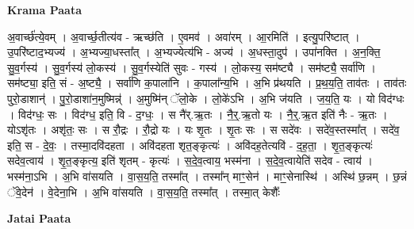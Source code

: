 \documentclass[17pt]{extarticle}
\begin{document}
\textbf{Krama Paata} \newline

अ॒वार्च्छ॑त्ये॒वम् । अ॒वार्च्छ॒तीत्य॑व - ऋच्छ॑ति । ए॒वमव॑ । अवा॑रम् । आ॒रमिति॑ । इत्यु॒परि॑ष्टात् । उ॒परि॑ष्टाद॒भ्यज्य॑ । अ॒भ्यज्या॒धस्ता᳚त् । अ॒भ्यज्येत्य॑भि - अज्य॑ । अ॒धस्ता॒दुप॑ । उपा॑नक्ति । अ॒न॒क्ति॒ सु॒व॒र्गस्य॑ । सु॒व॒र्गस्य॑ लो॒कस्य॑ । सु॒व॒र्गस्येति॑ सुवः - गस्य॑ । लो॒कस्य॒ सम॑ष्ट्यै । सम॑ष्ट्यै॒ सर्वा॑णि । सम॑ष्ट्या॒ इति॒ सं - अ॒ष्ट्यै॒ । सर्वा॑णि क॒पाला॑नि । क॒पाला᳚न्य॒भि । अ॒भि प्र॑थयति । प्र॒थ॒य॒ति॒ ताव॑तः । ताव॑तः पुरो॒डाशान्॑ । पु॒रो॒डाशा॑न॒मुष्मिन्न्॑ । अ॒मुष्मि॑न् ॅलो॒के । लो॒के॑ऽभि । अ॒भि ज॑यति । ज॒य॒ति॒ यः । यो विद॑ग्धः । विद॑ग्धः॒ सः । विद॑ग्ध॒ इति॒ वि - द॒ग्धः॒ । स नै॑र्.ऋ॒तः । नै॒र्॒.ऋ॒तो यः । नै॒र्॒.ऋ॒त इति॑ नैः - ऋ॒तः । योऽशृ॑तः । अशृ॑तः॒ सः । स रौ॒द्रः । रौ॒द्रो यः । यः शृ॒तः । शृ॒तः सः । स सदे॑वः । सदे॑व॒स्तस्मा᳚त् । सदे॑व॒ इति॒ स - दे॒वः॒ । तस्मा॒दवि॑दहता । अवि॑दहता शृत॒ङ्कृत्यः॑ । अवि॑दह॒तेत्यवि॑ - द॒ह॒ता॒ । शृ॒त॒ङ्कृत्यः॑ सदेव॒त्वाय॑ । शृ॒त॒ङ्कृत्य॒ इति॑ शृतम् - कृत्यः॑ । स॒दे॒व॒त्वाय॒ भस्म॑ना । स॒दे॒व॒त्वायेति॑ सदेव - त्वाय॑ । भस्म॑ना॒ऽभि । अ॒भि वा॑सयति । वा॒स॒य॒ति॒ तस्मा᳚त् । तस्मा᳚न् माꣳ॒॒सेन॑ । माꣳ॒॒सेनास्थि॑ । अस्थि॑ छ॒न्नम् । छ॒न्नं ॅवे॒देन॑ । वे॒देना॒भि । अ॒भि वा॑सयति । वा॒स॒य॒ति॒ तस्मा᳚त् । तस्मा॒त् केशैः᳚ \newline

\textbf{Jatai Paata} \newline
\end{document}
